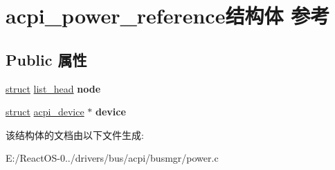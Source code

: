 \hypertarget{structacpi__power__reference}{}\section{acpi\+\_\+power\+\_\+reference结构体 参考}
\label{structacpi__power__reference}
\subsection*{Public 属性}
\begin{DoxyCompactItemize}
\item 
\mbox{\label{structacpi__power__reference_a7f232bcd420e52fad42012c507c3b5f1}} 
\hyperlink{interfacestruct}{struct} \hyperlink{structlist__head}{list\+\_\+head} {\bfseries node}
\item 
\mbox{\label{structacpi__power__reference_ac0acdd1f2b2d03539e41adae912764d8}} 
\hyperlink{interfacestruct}{struct} \hyperlink{structacpi__device}{acpi\+\_\+device} $\ast$ {\bfseries device}
\end{DoxyCompactItemize}


该结构体的文档由以下文件生成\+:\begin{DoxyCompactItemize}
\item 
E\+:/\+React\+O\+S-\/0../drivers/bus/acpi/busmgr/power.\+c\end{DoxyCompactItemize}
